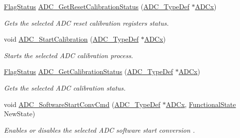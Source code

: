 \begin{DoxyCompactItemize}
\mbox{\hyperlink{group___exported__types_ga89136caac2e14c55151f527ac02daaff}{Flag\+Status}} \mbox{\hyperlink{group___a_d_c___private___functions_ga113be9fe25add8d7496bed659c68e02b}{A\+D\+C\+\_\+\+Get\+Reset\+Calibration\+Status}} (\mbox{\hyperlink{struct_a_d_c___type_def}{A\+D\+C\+\_\+\+Type\+Def}} $\ast$\mbox{\hyperlink{group___s_t_m32_f1_x_x___n_u_c_l_e_o___l_o_w___l_e_v_e_l___exported___constants_gab44c1065d38c298955fc028346984340}{A\+D\+Cx}})
\begin{DoxyCompactList}\small\item\em Gets the selected A\+DC reset calibration registers status. \end{DoxyCompactList}\item 
void \mbox{\hyperlink{group___a_d_c___private___functions_gadcba6341124a6aabfd2dd885ca8e5f14}{A\+D\+C\+\_\+\+Start\+Calibration}} (\mbox{\hyperlink{struct_a_d_c___type_def}{A\+D\+C\+\_\+\+Type\+Def}} $\ast$\mbox{\hyperlink{group___s_t_m32_f1_x_x___n_u_c_l_e_o___l_o_w___l_e_v_e_l___exported___constants_gab44c1065d38c298955fc028346984340}{A\+D\+Cx}})
\begin{DoxyCompactList}\small\item\em Starts the selected A\+DC calibration process. \end{DoxyCompactList}\item 
\mbox{\hyperlink{group___exported__types_ga89136caac2e14c55151f527ac02daaff}{Flag\+Status}} \mbox{\hyperlink{group___a_d_c___private___functions_ga7a728f699b487c7fa1694d7424967122}{A\+D\+C\+\_\+\+Get\+Calibration\+Status}} (\mbox{\hyperlink{struct_a_d_c___type_def}{A\+D\+C\+\_\+\+Type\+Def}} $\ast$\mbox{\hyperlink{group___s_t_m32_f1_x_x___n_u_c_l_e_o___l_o_w___l_e_v_e_l___exported___constants_gab44c1065d38c298955fc028346984340}{A\+D\+Cx}})
\begin{DoxyCompactList}\small\item\em Gets the selected A\+DC calibration status. \end{DoxyCompactList}\item 
void \mbox{\hyperlink{group___a_d_c___private___functions_ga694130a8d1ad3c8877b7eddb29611b30}{A\+D\+C\+\_\+\+Software\+Start\+Conv\+Cmd}} (\mbox{\hyperlink{struct_a_d_c___type_def}{A\+D\+C\+\_\+\+Type\+Def}} $\ast$\mbox{\hyperlink{group___s_t_m32_f1_x_x___n_u_c_l_e_o___l_o_w___l_e_v_e_l___exported___constants_gab44c1065d38c298955fc028346984340}{A\+D\+Cx}}, \mbox{\hyperlink{group___exported__types_gac9a7e9a35d2513ec15c3b537aaa4fba1}{Functional\+State}} New\+State)
\begin{DoxyCompactList}\small\item\em Enables or disables the selected A\+DC software start conversion . \end{DoxyCompactList}\item 

\end{DoxyCompactItemize}
